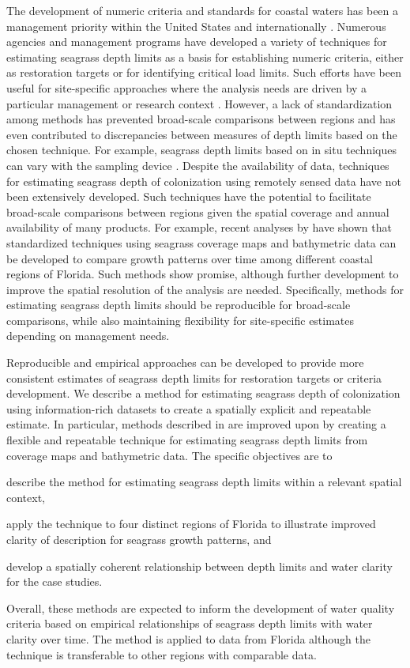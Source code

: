 \documentclass[letterpaper,12pt,oneside]{article}\usepackage[]{graphicx}\usepackage[]{color}
\begin{document}
The development of numeric criteria and standards for coastal waters has been a management priority within the United States  and internationally \citep{WFD00}.  Numerous agencies and management programs have developed a variety of techniques for estimating seagrass depth limits as a basis for establishing numeric criteria, either as restoration targets or for identifying critical load limits.  Such efforts have been useful for site-specific approaches where the analysis needs are driven by a particular management or research context \citep[e.g.,][]{Iverson86,Hale04}. However, a lack of standardization among methods has prevented broad-scale comparisons between regions and has even contributed to discrepancies between measures of depth limits based on the chosen technique.  For example, seagrass depth limits based on in situ techniques can vary with the sampling device \citep{Spears09}.  Despite the availability of data, techniques for estimating seagrass depth of colonization using remotely sensed data have not been extensively developed.  Such techniques have the potential to facilitate broad-scale comparisons between regions given the spatial coverage and annual availability of many products.  For example, recent analyses by  have shown that standardized techniques using seagrass coverage maps and bathymetric data can be developed to compare growth patterns over time among different coastal regions of Florida.  Such methods show promise, although further development to improve the spatial resolution of the analysis are needed.  Specifically, methods for estimating seagrass depth limits should be reproducible for broad-scale comparisons, while also maintaining flexibility for site-specific estimates depending on management needs.

Reproducible and empirical approaches can be developed to provide more consistent estimates of seagrass depth limits for restoration targets or criteria development. We describe a method for estimating seagrass depth of colonization using information-rich datasets to create a spatially explicit and repeatable estimate.  In particular, methods described in  are improved upon by creating a flexible and repeatable technique for estimating seagrass depth limits from coverage maps and bathymetric data. The specific objectives are to\begin{inparaenum}[1\upshape)]
\item describe the method for estimating seagrass depth limits within a relevant spatial context, 
\item apply the technique to four distinct regions of Florida to illustrate improved clarity of description for seagrass growth patterns, and
\item develop a spatially coherent relationship between depth limits and water clarity for the case studies.  
\end{inparaenum}
Overall, these methods are expected to inform the development of water quality criteria based on empirical relationships of seagrass depth limits with water clarity over time.  The method is applied to data from Florida although the technique is transferable to other regions with comparable data. 
\end{document}
